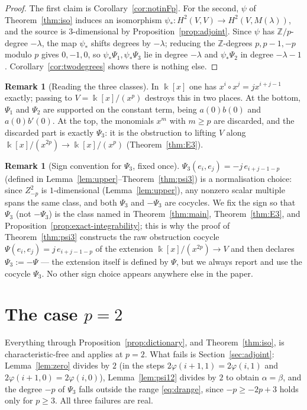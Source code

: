 \documentclass[11pt,reqno]{amsart}
\theoremstyle{plain}
\theoremstyle{definition}
\newtheorem{remark}[theorem]{Remark}
\newcommand{\kk}{\Bbbk}
\newcommand{\Zt}{Z^2}
\newcommand{\Ht}{H^2}
\newcommand{\Zp}{\mathbb{Z}/p}
\begin{document}
\begin{proof}
The first claim is Corollary~\ref{cor:notinFp}. For the second, $\psi$ of
Theorem~\ref{thm:iso} induces an isomorphism $\psi_*:\Ht(V,V)\to\Ht(V,M(\lambda))$, and the
source is $3$-dimensional by Proposition~\ref{prop:adjoint}. Since $\psi$ has $\Zp$-degree
$-\lambda$, the map $\psi_*$ shifts degrees by $-\lambda$; reducing the $\mathbb{Z}$-degrees
$p,p-1,-p$ modulo $p$ gives $0,-1,0$, so $\psi_*\Psi_1,\psi_*\Psi_3$ lie in degree
$-\lambda$ and $\psi_*\Psi_2$ in degree $-\lambda-1$. Corollary~\ref{cor:twodegrees} shows
there is nothing else.
\end{proof}

\begin{remark}[Reading the three classes]\label{rem:reading}
In $\kk[x]$ one has $x^i\circ x^j=jx^{i+j-1}$ exactly; passing to $V=\kk[x]/(x^p)$ destroys
this in two places. At the bottom, $\Psi_1$ and $\Psi_2$ are supported on the constant term,
being $a(0)b(0)$ and $a(0)b'(0)$. At the top, the monomials $x^m$ with $m\ge p$ are
discarded, and the discarded part is exactly $\Psi_3$: it is the obstruction to lifting $V$
along $\kk[x]/(x^{2p})\to\kk[x]/(x^p)$ (Theorem~\ref{thm:E3}).
\end{remark}

\begin{remark}[Sign convention for $\Psi_3$, fixed once]\label{rem:sign}
$\Psi_3(e_i,e_j)=-j\,e_{i+j-1-p}$ (defined in Lemma~\ref{lem:upper}--Theorem~\ref{thm:psi3})
is a normalisation choice: since $\Zt_{-p}$ is $1$-dimensional (Lemma~\ref{lem:upper}), any
nonzero scalar multiple spans the same class, and both $\Psi_3$ and $-\Psi_3$ are cocycles.
We fix the sign so that $\Psi_3$ (not $-\Psi_3$) is the class named in
Theorem~\ref{thm:main}, Theorem~\ref{thm:E3}, and Proposition~\ref{prop:exact-integrability};
this is why the proof of Theorem~\ref{thm:psi3} constructs the raw obstruction cocycle
$\Psi(e_i,e_j)=j\,e_{i+j-1-p}$ of the extension $\kk[x]/(x^{2p})\to V$ and then declares
$\Psi_3:=-\Psi$ --- the extension itself is defined by $\Psi$, but we always report and use
the cocycle $\Psi_3$. No other sign choice appears anywhere else in the paper.
\end{remark}

\section{The case $p=2$}\label{sec:p2}

Everything through Proposition~\ref{prop:dictionary}, and Theorem~\ref{thm:iso}, is
characteristic-free and applies at $p=2$. What fails is Section~\ref{sec:adjoint}:
Lemma~\ref{lem:zero} divides by $2$ (in the steps $2\varphi(i+1,1)=2\varphi(i,1)$ and
$2\varphi(i+1,0)=2\varphi(i,0)$), Lemma~\ref{lem:psi12} divides by $2$ to obtain
$\alpha=\beta$, and the degree $-p$ of $\Psi_3$ falls outside the range \eqref{eq:drange},
since $-p\ge-2p+3$ holds only for $p\ge3$. All three failures are real.
\end{document}
